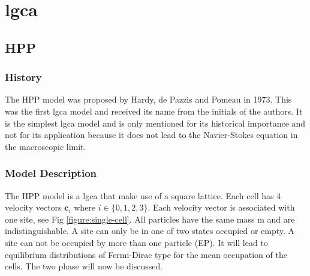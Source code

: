 \documentclass[a4paper,10pt]{article}
\begin{document}
\section{\acrfull{lgca}}
\subsection{HPP}
\subsubsection{History}
The HPP model was proposed by Hardy, de Pazzis and Pomeau in 1973.
This was the first \acrshort{lgca} model and received its name from the initials of the authors. It is the simplest \acrshort{lgca} model and is only mentioned for its historical importance and not for its application because it does not lead to the Navier-Stokes equation in the macroscopic limit. 
\subsubsection{Model Description}
The HPP model is a \acrshort{lgca} that make use of a square lattice.
Each cell has 4 velocity vectors $\textbf{c}_{i}$ where $i \in \{0, 1, 2, 3\}$. Each velocity vector is associated with one site, see Fig \ref{figure:single-cell}. All particles have the same mass m and are indistinguishable. A site can only be in one of two states occupied or empty. A site can not be occupied by more than one particle (\Gls{EP}). It will lead to equilibrium distributions of Fermi-Dirac type for
the mean occupation of the cells.%
The two phase will now be discussed.
\end{document}
